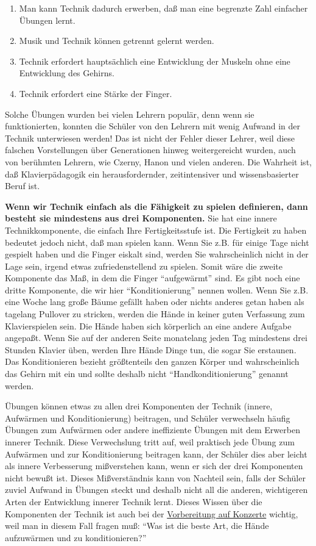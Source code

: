 \begin{enumerate}[label={\roman*.}] 
 \item Man kann Technik dadurch erwerben, daß man eine begrenzte Zahl einfacher Übungen lernt.
 \item Musik und Technik können getrennt gelernt werden.
 \item Technik erfordert hauptsächlich eine Entwicklung der Muskeln ohne eine Entwicklung des Gehirns.
 \item Technik erfordert eine Stärke der Finger.
\end{enumerate}

Solche Übungen wurden bei vielen Lehrern populär, denn wenn sie funktionierten, konnten die Schüler von den Lehrern mit wenig Aufwand in der Technik unterwiesen werden!
Das ist nicht der Fehler dieser Lehrer, weil diese falschen Vorstellungen über Generationen hinweg weitergereicht wurden, auch von berühmten Lehrern, wie Czerny, Hanon und vielen anderen.
Die Wahrheit ist, daß Klavierpädagogik ein herausfordernder, zeitintensiver und wissensbasierter Beruf ist.

\textbf{Wenn wir Technik einfach als die Fähigkeit zu spielen definieren, dann besteht sie mindestens aus drei Komponenten.}
Sie hat eine innere Technikkomponente, die einfach Ihre Fertigkeitsstufe ist.
Die Fertigkeit zu haben bedeutet jedoch nicht, daß man spielen kann.
Wenn Sie z.B. für einige Tage nicht gespielt haben und die Finger eiskalt sind, werden Sie wahrscheinlich nicht in der Lage sein, irgend etwas zufriedenstellend zu spielen.
Somit wäre die zweite Komponente das Maß, in dem die Finger \enquote{aufgewärmt} sind.
Es gibt noch eine dritte Komponente, die wir hier \enquote{Konditionierung} nennen wollen.
Wenn Sie z.B. eine Woche lang große Bäume gefällt haben oder nichts anderes getan haben als tagelang Pullover zu stricken, werden die Hände in keiner guten Verfassung zum Klavierspielen sein.
Die Hände haben sich körperlich an eine andere Aufgabe angepaßt.
Wenn Sie auf der anderen Seite monatelang jeden Tag mindestens drei Stunden Klavier üben, werden Ihre Hände Dinge tun, die sogar Sie erstaunen.
Das Konditionieren bezieht größtenteils den ganzen Körper und wahrscheinlich das Gehirn mit ein und sollte deshalb nicht \enquote{Handkonditionierung} genannt werden.

Übungen können etwas zu allen drei Komponenten der Technik (innere, Aufwärmen und Konditionierung) beitragen, und Schüler verwechseln häufig Übungen zum Aufwärmen oder andere ineffiziente Übungen mit dem Erwerben innerer Technik.
Diese Verwechslung tritt auf, weil praktisch jede Übung zum Aufwärmen und zur Konditionierung beitragen kann, der Schüler dies aber leicht als innere Verbesserung mißverstehen kann, wenn er sich der drei Komponenten nicht bewußt ist.
Dieses Mißverständnis kann von Nachteil sein, falls der Schüler zuviel Aufwand in Übungen steckt und deshalb nicht all die anderen, wichtigeren Arten der Entwicklung innerer Technik lernt.
Dieses Wissen über die Komponenten der Technik ist auch bei der \hyperref[c1iii14]{Vorbereitung auf Konzerte} wichtig, weil man in diesem Fall fragen muß: \enquote{Was ist die beste Art, die Hände aufzuwärmen und zu konditionieren?}

